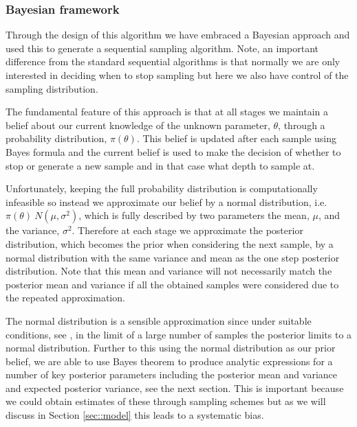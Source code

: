 \subsubsection{Bayesian framework}\label{sec::bayes}
Through the design of this algorithm we have embraced a Bayesian approach \cite{} and used this to generate a sequential sampling algorithm. Note, an important difference from the standard sequential algorithms is that normally we are only interested in deciding when to stop sampling but here we also have control of the sampling distribution.

The fundamental feature of this approach is that at all stages we maintain a belief about our current knowledge of the unknown parameter, $\theta$, through a probability distribution, $\pi(\theta)$. This belief is updated after each sample using Bayes formula \cite{} and the current belief is used to make the decision of whether to  stop or generate a new sample and in that case what depth to sample at.

Unfortunately, keeping the full probability distribution is computationally infeasible so instead we approximate our belief by a normal distribution, i.e. $\pi(\theta)~N(\mu,\sigma^2)$, which is fully described by two parameters the mean, $\mu$, and the variance, $\sigma^2$. Therefore at each stage we approximate the posterior distribution, which becomes the prior when considering the next sample, by a normal distribution with the same variance and mean as the one step posterior distribution. Note that this mean and variance will not necessarily match the posterior mean and variance if all the obtained samples were considered due to the repeated approximation.

The normal distribution is a sensible approximation since under suitable conditions, see \cite{}, in the limit of a large number of samples the posterior limits to a normal distribution. Further to this using the normal distribution as our prior belief, we are able to use Bayes theorem to produce analytic expressions for a number of key posterior parameters including the posterior mean and variance and expected posterior variance, see the next section. This is important because we could obtain estimates of these through sampling schemes \cite{} but as we will discuss in Section \ref{sec::model} this leads to a systematic bias.

